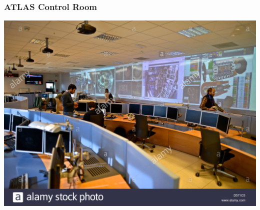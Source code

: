 \documentclass{beamer}
\begin{document}
\begin{frame}
    \frametitle{ATLAS Control Room}
    \includegraphics[scale=0.3]{ATLASControlRoom.jpg}
\end{frame}
\end{document}
